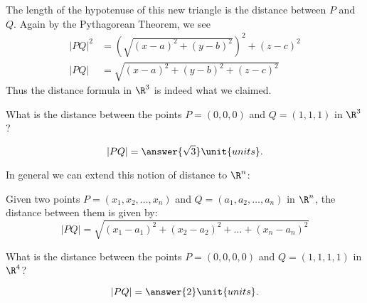\documentclass{ximera}
\begin{document}
\begin{theorem}
\begin{explanation}
\begin{image}
    \end{image}
    The length of the hypotenuse of this new triangle is the distance between $P$ and $Q$. Again by the Pythagorean Theorem, we see
    \begin{align*}
      |PQ|^2 &= \left(\sqrt{(x-a)^2+(y-b)^2}\right)^2 + (z-c)^2\\
      |PQ| &=  \sqrt{(x-a)^2+(y-b)^2 + (z-c)^2}
    \end{align*}
    Thus the distance formula in $\R^3$ is indeed what we claimed.
  \end{explanation}
\end{theorem}

\begin{question}
  What is the distance between the points $P=(0,0,0)$ and $Q=(1,1,1)$
  in $\R^3$?
  \begin{prompt}
    \[
    |PQ|=\answer{\sqrt{3}}\unit{units}.
    \]
  \end{prompt}
\end{question}


In general we can extend this notion of distance to $\R^n$:

\begin{theorem}
  Given two points $P=(x_1,x_2,\dots,x_n)$ and $Q=(a_1,a_2,\dots,a_n)$
  in $\R^n$, the distance between them is given by:
  \[
  |PQ|=\sqrt{(x_1-a_1)^2 + (x_2-a_2)^2 + \dots + (x_n-a_n)^2}
  \]
\end{theorem}

\begin{question}
  What is the distance between the points $P=(0,0,0,0)$ and $Q=(1,1,1,1)$ in $\R^4$?
  \begin{prompt}
    \[
    |PQ|=\answer{2}\unit{units}.
    \]
  \end{prompt}
\end{question}
\end{document}
